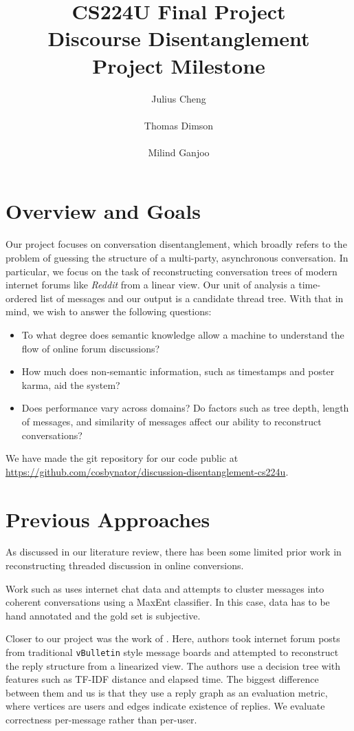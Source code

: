 \documentclass[10pt]{article}
\title{{\small CS224U Final Project} \\ Discourse Disentanglement \\{\small Project Milestone}}
\author{Julius Cheng \\
  \\\And
  Thomas Dimson  \\
  \\\And
  Milind Ganjoo \\
}
\date{}
\begin{document}
\maketitle

\section{Overview and Goals}
Our project focuses on conversation disentanglement, which broadly refers to
the problem of guessing the structure of a multi-party, asynchronous
conversation. In particular, we focus on the task of reconstructing conversation
trees of modern internet forums like \textit{Reddit} from a linear view. Our unit of 
analysis a time-ordered list of messages and our output is a candidate thread tree. 
With that in mind, we wish to answer the following questions:

\begin{itemize}
  \item To what degree does semantic knowledge allow a machine to understand the 
    flow of online forum discussions?
  \item How much does non-semantic information, such as timestamps and poster karma,
    aid the system?
  \item Does performance vary across domains? Do factors such as tree depth,
    length of messages, and similarity of messages affect our ability to
    reconstruct conversations? 
\end{itemize}

We have made the git repository for our code public at 
\url{https://github.com/cosbynator/discussion-disentanglement-cs224u}.

\section{Previous Approaches}
\label{sec:approaches}
As discussed in our literature review, there has been some limited prior 
work in reconstructing threaded discussion in online conversions. 

Work such as \cite{Elsner2008a} 
uses internet chat data and attempts to cluster messages into coherent 
conversations using a MaxEnt classifier. In this case, data has to be hand annotated and
the gold set is subjective.

Closer to our project was the work of \cite{Aumayr2011a}. Here, authors took
internet forum posts from traditional \texttt{vBulletin} style message boards
and attempted to reconstruct the reply structure from a linearized view. The authors
use a decision tree with features such as TF-IDF distance and elapsed time. The biggest
difference between them and us is that they use a reply graph as an evaluation metric,
where vertices are users and edges indicate existence of replies. We evaluate correctness
per-message rather than per-user.
\end{document}
